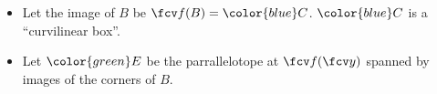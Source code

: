 \begin{frame}
\begin{itemize}
\item<7-> Let the image of $B$ be $\fcv f(B)={\color{blue}C}$. ${\color{blue}C} $ is a ``curvilinear box''. 
\item<8-> Let ${\color{green}E}$ be the parrallelotope at $\fcv f(\fcv y)$ spanned by images of the corners of $B$. 
\end{itemize}

\vskip 10cm
\end{frame}


